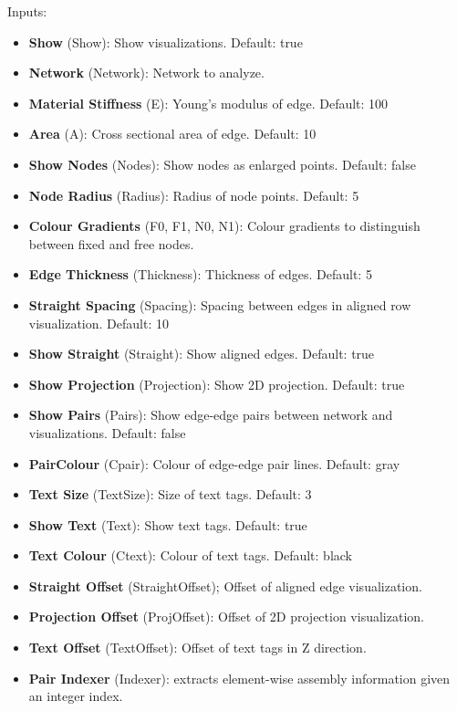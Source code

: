 Inputs:
\begin{itemize}
    \setlength\itemsep{0.05em}
    \item \textbf{Show} (Show): Show visualizations. {\color{gray} Default: true}
    \item \textbf{Network} (Network): Network to analyze.
    \item \textbf{Material Stiffness} (E): Young's modulus of edge. {\color{gray} Default: 100}
    \item \textbf{Area} (A): Cross sectional area of edge. {\color{gray} Default: 10}
    \item \textbf{Show Nodes} (Nodes): Show nodes as enlarged points. {\color{gray} Default: false}
    \item \textbf{Node Radius} (Radius): Radius of node points. {\color{gray} Default: 5}
    \item  \textbf{Colour Gradients} (F0, F1, N0, N1): Colour gradients to distinguish between fixed and free nodes.
    \item \textbf{Edge Thickness} (Thickness): Thickness of edges. {\color{gray} Default: 5}
    \item \textbf{Straight Spacing} (Spacing): Spacing between edges in aligned row visualization. {\color{gray} Default: 10}
    \item \textbf{Show Straight} (Straight): Show aligned edges. {\color{gray} Default: true}
    \item \textbf{Show Projection} (Projection): Show 2D projection. {\color{gray} Default: true}
    \item \textbf{Show Pairs} (Pairs): Show edge-edge pairs between network and visualizations. {\color{gray} Default: false}
    \item \textbf{PairColour} (Cpair): Colour of edge-edge pair lines. {\color{gray} Default: gray}
    \item \textbf{Text Size} (TextSize): Size of text tags. {\color{gray} Default: 3}
    \item \textbf{Show Text} (Text): Show text tags. {\color{gray} Default: true}
    \item \textbf{Text Colour} (Ctext): Colour of text tags. {\color{gray} Default:} black
    \item \textbf{Straight Offset} (StraightOffset); Offset of aligned edge visualization.
    \item \textbf{Projection Offset} (ProjOffset): Offset of 2D projection visualization.
    \item \textbf{Text Offset} (TextOffset): Offset of text tags in Z direction.
    \item \textbf{Pair Indexer} (Indexer): extracts element-wise assembly information given an integer index.
\end{itemize}